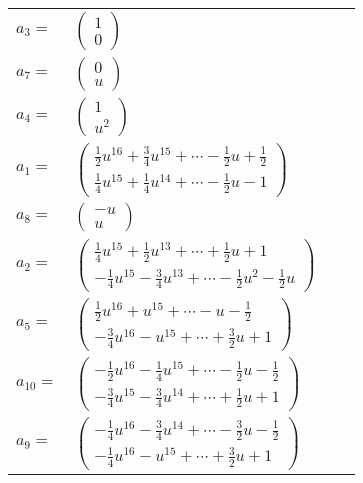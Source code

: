 \documentclass[1p]{elsarticle_modified}
\theoremstyle{definition}
\begin{document}
\begin{tabular}{m{7pt} m{180pt} m{7pt} m{180pt} }
\flushright $a_{3}=$&$\begin{pmatrix}1\\0\end{pmatrix}$ \\
\flushright $a_{7}=$&$\begin{pmatrix}0\\u\end{pmatrix}$ \\
\flushright $a_{4}=$&$\begin{pmatrix}1\\u^2\end{pmatrix}$ \\
\flushright $a_{1}=$&$\begin{pmatrix}\frac{1}{2} u^{16}+\frac{3}{4} u^{15}+\cdots-\frac{1}{2} u+\frac{1}{2}\\\frac{1}{4} u^{15}+\frac{1}{4} u^{14}+\cdots-\frac{1}{2} u-1\end{pmatrix}$ \\
\flushright $a_{8}=$&$\begin{pmatrix}- u\\u\end{pmatrix}$ \\
\flushright $a_{2}=$&$\begin{pmatrix}\frac{1}{4} u^{15}+\frac{1}{2} u^{13}+\cdots+\frac{1}{2} u+1\\-\frac{1}{4} u^{15}-\frac{3}{4} u^{13}+\cdots-\frac{1}{2} u^2-\frac{1}{2} u\end{pmatrix}$ \\
\flushright $a_{5}=$&$\begin{pmatrix}\frac{1}{2} u^{16}+u^{15}+\cdots- u-\frac{1}{2}\\-\frac{3}{4} u^{16}- u^{15}+\cdots+\frac{3}{2} u+1\end{pmatrix}$ \\
\flushright $a_{10}=$&$\begin{pmatrix}-\frac{1}{2} u^{16}-\frac{1}{4} u^{15}+\cdots-\frac{1}{2} u-\frac{1}{2}\\-\frac{3}{4} u^{15}-\frac{3}{4} u^{14}+\cdots+\frac{1}{2} u+1\end{pmatrix}$ \\
\flushright $a_{9}=$&$\begin{pmatrix}-\frac{1}{4} u^{16}-\frac{3}{4} u^{14}+\cdots-\frac{3}{2} u-\frac{1}{2}\\-\frac{1}{4} u^{16}- u^{15}+\cdots+\frac{3}{2} u+1\end{pmatrix}$ \\

\end{tabular}
\end{document}
